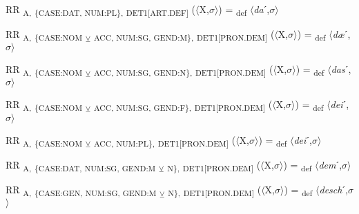{\begin{exe}
 RR \textsubscript{A,} \textsubscript{\{CASE:DAT, NUM:PL\},} \textsubscript{DET1[ART.DEF]} ($\langle$X,$\sigma $$\rangle$) = \textsubscript{def} $\langle$\textit{da}ˊ,$\sigma $$\rangle$
\end{exe}

\begin{exe}
 RR \textsubscript{A,} \textsubscript{\{CASE:NOM} \textsubscript{${\veebar}$}\textsubscript{ ACC, NUM:SG, GEND:M\},} \textsubscript{DET1[PRON.DEM]} ($\langle$X,$\sigma $$\rangle$) = \textsubscript{def} $\langle$\textit{dæ}ˊ,$\sigma $$\rangle$
\end{exe}

\begin{exe}
 RR \textsubscript{A,} \textsubscript{\{CASE:NOM} \textsubscript{${\veebar}$}\textsubscript{ ACC, NUM:SG, GEND:N\},} \textsubscript{DET1[PRON.DEM]} ($\langle$X,$\sigma $$\rangle$) = \textsubscript{def} $\langle$\textit{das}ˊ,$\sigma $$\rangle$
\end{exe}

\begin{exe}
 RR \textsubscript{A,} \textsubscript{\{CASE:NOM} \textsubscript{${\veebar}$}\textsubscript{ ACC, NUM:SG, GEND:F\},} \textsubscript{DET1[PRON.DEM]} ($\langle$X,$\sigma $$\rangle$) = \textsubscript{def} $\langle$\textit{dei}ˊ,$\sigma $$\rangle$
\end{exe}

\begin{exe}
 RR \textsubscript{A,} \textsubscript{\{CASE:NOM} \textsubscript{${\veebar}$}\textsubscript{ ACC, NUM:PL\},} \textsubscript{DET1[PRON.DEM]} ($\langle$X,$\sigma $$\rangle$) = \textsubscript{def} $\langle$\textit{dei}ˊ,$\sigma $$\rangle$
\end{exe}

\begin{exe}
 RR \textsubscript{A,} \textsubscript{\{CASE:DAT, NUM:SG, GEND:M} \textsubscript{${\veebar}$}\textsubscript{ N\},} \textsubscript{DET1[PRON.DEM]} ($\langle$X,$\sigma $$\rangle$) = \textsubscript{def} $\langle$\textit{dem}ˊ,$\sigma $$\rangle$
\end{exe}

\begin{exe}
 RR \textsubscript{A,} \textsubscript{\{CASE:GEN, NUM:SG, GEND:M} \textsubscript{${\veebar}$}\textsubscript{ N\},} \textsubscript{DET1[PRON.DEM]} ($\langle$X,$\sigma $$\rangle$) = \textsubscript{def} $\langle$\textit{desch}ˊ,$\sigma $$\rangle$
\end{exe}

}
